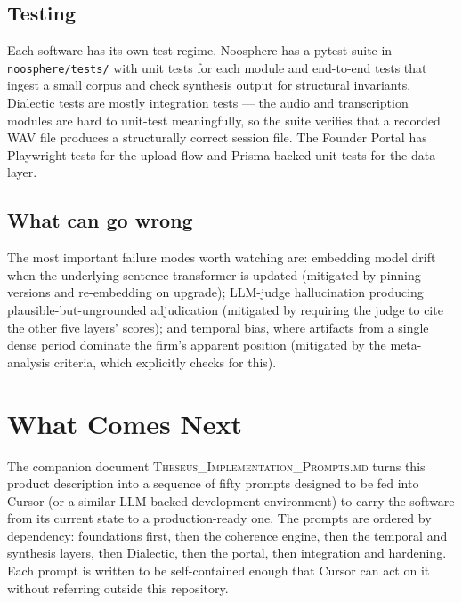 \documentclass[11pt]{article}
\begin{document}
\subsection{Testing}

Each software has its own test regime. Noosphere has a pytest suite in \texttt{noosphere/tests/} with unit tests for each module and end-to-end tests that ingest a small corpus and check synthesis output for structural invariants. Dialectic tests are mostly integration tests --- the audio and transcription modules are hard to unit-test meaningfully, so the suite verifies that a recorded WAV file produces a structurally correct session file. The Founder Portal has Playwright tests for the upload flow and Prisma-backed unit tests for the data layer.

\subsection{What can go wrong}

The most important failure modes worth watching are: embedding model drift when the underlying sentence-transformer is updated (mitigated by pinning versions and re-embedding on upgrade); LLM-judge hallucination producing plausible-but-ungrounded adjudication (mitigated by requiring the judge to cite the other five layers' scores); and temporal bias, where artifacts from a single dense period dominate the firm's apparent position (mitigated by the meta-analysis criteria, which explicitly checks for this).

\clearpage

\section{What Comes Next}

The companion document \textsc{Theseus\_Implementation\_Prompts.md} turns this product description into a sequence of fifty prompts designed to be fed into Cursor (or a similar LLM-backed development environment) to carry the software from its current state to a production-ready one. The prompts are ordered by dependency: foundations first, then the coherence engine, then the temporal and synthesis layers, then Dialectic, then the portal, then integration and hardening. Each prompt is written to be self-contained enough that Cursor can act on it without referring outside this repository.
\end{document}
